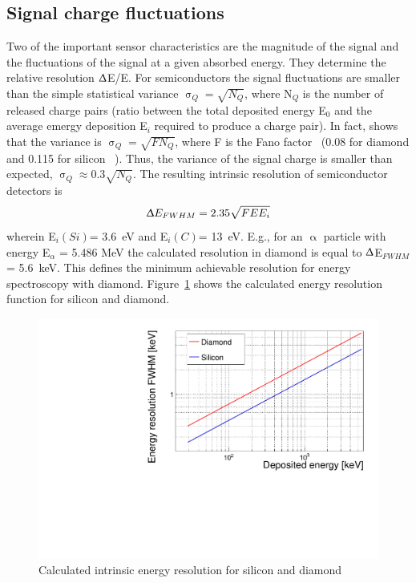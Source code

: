 \documentclass[twoside,12pt]{packages/mytustyle}  %
\begin{document}
\subsection{Signal charge fluctuations}
Two of the important sensor characteristics are the magnitude of the signal and the fluctuations of the signal at a given absorbed energy. They determine the relative resolution $\Updelta$E/E. For semiconductors the signal fluctuations are smaller than the simple statistical variance $\upsigma_Q=\sqrt{N_Q}$, where N$_Q$ is the number of released charge pairs (ratio between the total deposited energy E$_0$ and the average emergy deposition E$_i$ required to produce a charge pair). In fact, \cite{} shows that the variance is $\upsigma_Q=\sqrt{F N_Q}$, where F is the Fano factor~\cite{} (0.08 for diamond and 0.115 for silicon ~\cite{}). Thus, the variance of the signal charge is smaller than expected, $\upsigma_Q\approx0.3 \sqrt{N_Q}$. The resulting intrinsic resolution of semiconductor detectors is 
\begin{equation}
\label{eq:efwhm}
\Updelta E_{FWHM} = 2.35 \sqrt{FEE_i} 
\end{equation} 
wherein E$_i(Si)$= 3.6~eV and E$_i(C)$= 13~eV. E.g., for an $\upalpha$ particle with energy E$_\alpha$ = 5.486 MeV the calculated resolution in diamond is equal to $\Updelta$E$_{FWHM}$ = 5.6~keV. This defines the minimum achievable resolution for energy spectroscopy with diamond. Figure~\ref{fig:enerres} shows the calculated energy resolution function for silicon and diamond.


\begin{figure}[!t]
\begin{center}
\includegraphics[width=0.45\linewidth]{../../scripts/02_pulse_formation/plots/resolution}
\caption{Calculated intrinsic energy resolution for silicon and diamond}
\label{fig:enerres}
\end{center}
\end{figure}




\clearpage
\end{document}
